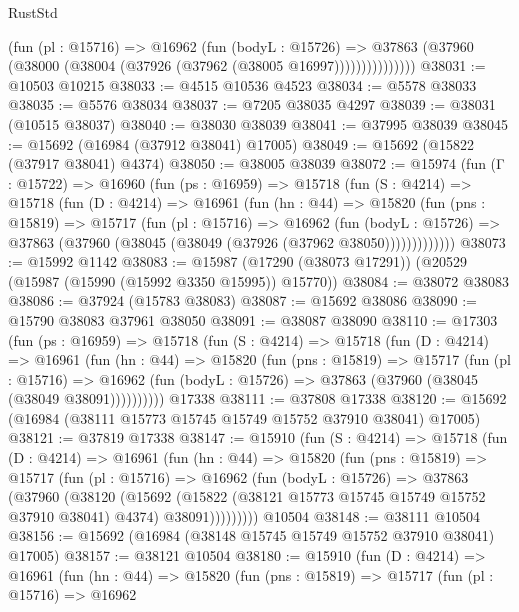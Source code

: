\begin{lexlean}{RustStd}
\begin{coremodule}
                  (fun (pl : @15716) =>
                  @16962
                    (fun (bodyL : @15726) =>
                    @37863 (@37960 (@38000 (@38004 (@37926 (@37962 (@38005 @16997)))))))))))))))
@38031 := @10503 @10215
@38033 := @4515 @10536 @4523
@38034 := @5578 @38033
@38035 := @5576 @38034
@38037 := @7205 @38035 @4297
@38039 := @38031 (@10515 @38037)
@38040 := @38030 @38039
@38041 := @37995 @38039
@38045 := @15692 (@16984 (@37912 @38041) @17005)
@38049 := @15692 (@15822 (@37917 @38041) @4374)
@38050 := @38005 @38039
@38072 := @15974
    (fun (Γ : @15722) =>
    @16960
      (fun (ps : @16959) =>
      @15718
        (fun (S : @4214) =>
        @15718
          (fun (D : @4214) =>
          @16961
            (fun (hn : @44) =>
            @15820
              (fun (pns : @15819) =>
              @15717
                (fun (pl : @15716) =>
                @16962
                  (fun (bodyL : @15726) =>
                  @37863 (@37960 (@38045 (@38049 (@37926 (@37962 @38050)))))))))))))
@38073 := @15992 @1142
@38083 := @15987 (@17290 (@38073 @17291)) (@20529 (@15987 (@15990 (@15992 @3350 @15995)) @15770))
@38084 := @38072 @38083
@38086 := @37924 (@15783 @38083)
@38087 := @15692 @38086
@38090 := @15790 @38083 @37961 @38050
@38091 := @38087 @38090
@38110 := @17303
    (fun (ps : @16959) =>
    @15718
      (fun (S : @4214) =>
      @15718
        (fun (D : @4214) =>
        @16961
          (fun (hn : @44) =>
          @15820
            (fun (pns : @15819) =>
            @15717
              (fun (pl : @15716) =>
              @16962 (fun (bodyL : @15726) => @37863 (@37960 (@38045 (@38049 @38091))))))))))
    @17338
@38111 := @37808 @17338
@38120 := @15692 (@16984 (@38111 @15773 @15745 @15749 @15752 @37910 @38041) @17005)
@38121 := @37819 @17338
@38147 := @15910
    (fun (S : @4214) =>
    @15718
      (fun (D : @4214) =>
      @16961
        (fun (hn : @44) =>
        @15820
          (fun (pns : @15819) =>
          @15717
            (fun (pl : @15716) =>
            @16962
              (fun (bodyL : @15726) =>
              @37863
                (@37960
                  (@38120
                    (@15692
                      (@15822 (@38121 @15773 @15745 @15749 @15752 @37910 @38041) @4374)
                      @38091)))))))))
    @10504
@38148 := @38111 @10504
@38156 := @15692 (@16984 (@38148 @15745 @15749 @15752 @37910 @38041) @17005)
@38157 := @38121 @10504
@38180 := @15910
    (fun (D : @4214) =>
    @16961
      (fun (hn : @44) =>
      @15820
        (fun (pns : @15819) =>
        @15717
          (fun (pl : @15716) =>
          @16962

\end{coremodule}
\end{lexlean}
